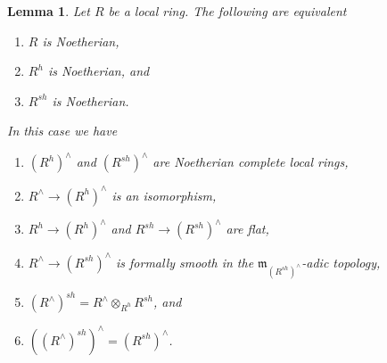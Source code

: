 \documentclass[10pt,a4paper]{amsart}
\theoremstyle{plain}
\newtheorem{lemma}[subsection]{Lemma}
\theoremstyle{definition}
\theoremstyle{remark}
\numberwithin{equation}{subsection}
\newenvironment{reference}{\comment}{\endcomment}
\begin{document}
\begin{lemma}
\label{lemma-henselization-noetherian}
\begin{reference}
\cite[IV, Theorem 18.6.6 and Proposition 18.8.8]{EGA}
\end{reference}
Let $R$ be a local ring. The following are equivalent
\begin{enumerate}
\item $R$ is Noetherian,
\item $R^h$ is Noetherian, and
\item $R^{sh}$ is Noetherian.
\end{enumerate}
In this case we have
\begin{enumerate}
\item[(a)] $(R^h)^\wedge$ and $(R^{sh})^\wedge$ are Noetherian complete
local rings,
\item[(b)] $R^\wedge \to (R^h)^\wedge$ is an isomorphism,
\item[(c)] $R^h \to (R^h)^\wedge$ and $R^{sh} \to (R^{sh})^\wedge$ are flat,
\item[(d)] $R^\wedge \to (R^{sh})^\wedge$ is formally smooth in
the $\mathfrak m_{(R^{sh})^\wedge}$-adic topology,
\item[(e)] $(R^\wedge)^{sh} = R^\wedge \otimes_{R^h} R^{sh}$, and
\item[(f)] $((R^\wedge)^{sh})^\wedge = (R^{sh})^\wedge$.
\end{enumerate}
\end{lemma}
\end{document}
